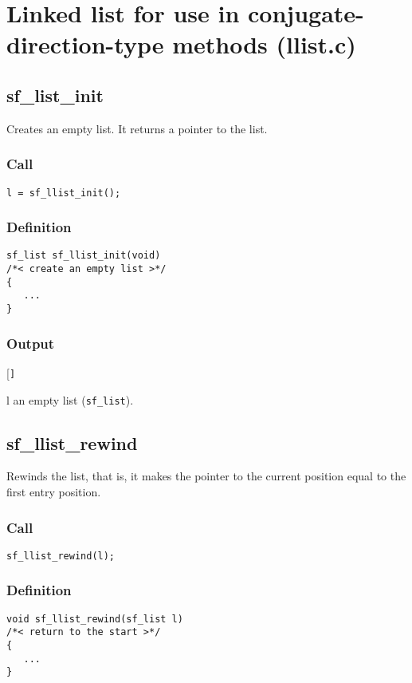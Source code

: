 \section{Linked list for use in conjugate-direction-type methods (llist.c)}\label{sec:llist.c}




\subsection{{sf\_list\_init}}
Creates an empty list. It returns a pointer to the list.

\subsubsection*{Call}
\begin{verbatim}l = sf_llist_init();\end{verbatim}

\subsubsection*{Definition}
\begin{verbatim}
sf_list sf_llist_init(void)
/*< create an empty list >*/
{
   ...
}
\end{verbatim}

\subsubsection*{Output}
\begin{desclist}{\tt }{\quad}[\tt ]
   \setlength\itemsep{0pt}
   \item[l] an empty list (\texttt{sf\_list}).  
\end{desclist}




\subsection{{sf\_llist\_rewind}}
Rewinds the list, that is, it makes the pointer to the current position equal to the first entry position.

\subsubsection*{Call}
\begin{verbatim}sf_llist_rewind(l);\end{verbatim}

\subsubsection*{Definition}
\begin{verbatim}
void sf_llist_rewind(sf_list l)
/*< return to the start >*/
{
   ...
}
\end{verbatim}

